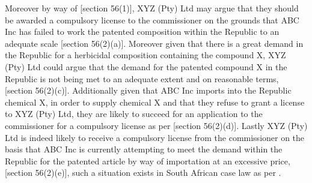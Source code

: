 \documentclass[11pt]{article}
\begin{document}
Moreover by way of [section 56(1)]\cite{rsa78_patents_act}, XYZ (Pty) Ltd may argue that they should be awarded a compulsory license
to the commissioner on the grounds that ABC Inc has failed to work the patented composition within the Republic to an adequate
scale [section 56(2)(a)]\cite{rsa78_patents_act}. Moreover given that there is a great demand in the Republic for a herbicidal
composition containing the compound X, XYZ (Pty) Ltd could argue that the demand for the patented compound X in the Republic is
not being met to an adequate extent and on reasonable terms, [section 56(2)(c)]\cite{rsa78_patents_act}. Additionally given that ABC
Inc imports into the Republic chemical X, in order to supply chemical X and that they refuse to grant a license to XYZ (Pty) Ltd,
they are likely to succeed for an application to the commissioner for a compulsory license as per [section
56(2)(d)]\cite{rsa78_patents_act}. Lastly XYZ (Pty) Ltd is indeed likely to receive a compulsory license from the commissioner on
the basis that ABC Inc is currently attempting to meet the demand within the Republic for the patented article by way of
importation at an excessive price, [section 56(2)(e)]\cite{rsa78_patents_act}, such a situation exists in South African case law as
per  \cite{harms99_syntheta_v_jansses}.

\printbibliography
\end{document}
